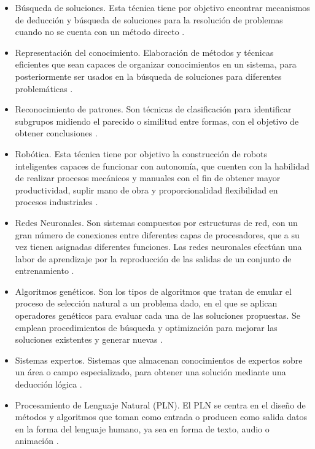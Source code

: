 \begin{itemize}
    \item Búsqueda de soluciones. Esta técnica tiene por objetivo encontrar mecanismos de deducción y búsqueda de soluciones para la resolución de problemas cuando no se cuenta con un método directo \cite{ref43}.\\
\item Representación del conocimiento. Elaboración de métodos y técnicas eficientes que sean capaces de organizar conocimientos en un sistema, para posteriormente ser usados en la búsqueda de soluciones para diferentes problemáticas \cite{ref43}.\\
\item Reconocimiento de patrones. Son técnicas de clasificación para identificar subgrupos midiendo el parecido o similitud entre formas, con el objetivo de obtener conclusiones \cite{ref43}.\\
\item Robótica. Esta técnica tiene por objetivo la construcción de robots inteligentes capaces de funcionar con autonomía, que cuenten con la habilidad de realizar procesos mecánicos y manuales con el fin de obtener mayor productividad, suplir mano de obra y proporcionalidad flexibilidad en procesos industriales \cite{ref43}.\\
\item Redes Neuronales. Son sistemas compuestos por estructuras de red, con un gran número de conexiones entre diferentes capas de procesadores, que a su vez tienen asignadas diferentes funciones. Las redes neuronales efectúan una labor de aprendizaje por la reproducción de las salidas de un conjunto de entrenamiento \cite{ref43}.\\
\item Algoritmos genéticos. Son los tipos de algoritmos que tratan de emular el proceso de selección natural a un problema dado, en el que se aplican operadores genéticos para evaluar cada una de las soluciones propuestas. Se emplean procedimientos de búsqueda y optimización para mejorar las soluciones existentes y generar nuevas \cite{ref43}.\\
\item Sistemas expertos. Sistemas que almacenan conocimientos de expertos sobre un área o campo especializado, para obtener una solución mediante una deducción lógica \cite{ref43}. \\
\item Procesamiento de Lenguaje Natural (PLN). El PLN se centra en el diseño de métodos y algoritmos que toman como entrada o producen como salida datos en la forma del lenguaje humano, ya sea en forma de texto, audio o animación \cite{ref44}.

\end{itemize}

